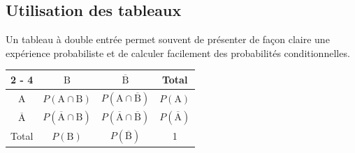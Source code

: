 \documentclass[12pt]{article}
\theoremstyle{break}
\newtheorem*{example}{Exemple.}
\newenvironment{demo}[1][\proofname]{%
  \begin{proof}[#1]$ $\newline
  }{%
  \end{proof}
}
\begin{document}
% 


\newpage
\subsection{Utilisation des tableaux}

Un tableau à double entrée permet souvent de présenter de façon claire une expérience probabiliste et de calculer facilement des probabilités conditionnelles.

\begin{center}
\renewcommand{\arraystretch}{1.5}
\begin{tabular}{|c|c|c|c|}
\cline { 2 - 4 }
\multicolumn{1}{c|}{} & $\mathrm{B}$ & $\overline{\mathrm{B}}$ & Total \\
\hline
$\mathrm{A}$ & $P(\mathrm{A} \cap \mathrm{B})$ & $P(\mathrm{A} \cap \overline{\mathrm{B}})$ & $P(\mathrm{A})$ \\
\hline
$\overline{\mathrm{A}}$ & $P(\overline{\mathrm{A}} \cap \mathrm{B})$ & $P(\overline{\mathrm{A}} \cap \overline{\mathrm{B}})$ & $P(\overline{\mathrm{A}})$ \\
\hline
Total & $P(\mathrm{B})$ & $P(\overline{\mathrm{B}})$ & 1 \\
\hline
\end{tabular}
\end{center}
\end{document}
